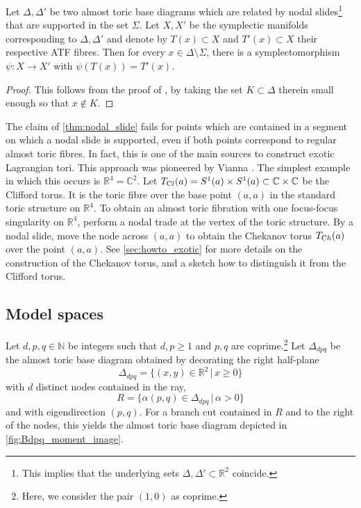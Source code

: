 \documentclass[12pt,a4paper,abstract=true,final]{scrartcl}
\begin{document}
\begin{lemma}
    \label{thm:nodal_slide}
    Let $\Delta, \Delta'$ be two almost toric base diagrams which are related by nodal slides\footnote{This implies that the underlying sets $\Delta, \Delta' \subset \mathbb{R}^2$ coincide.} that are supported in the set $\Sigma$.
Let $X,X'$ be the symplectic manifolds corresponding to $\Delta,\Delta'$ and denote by $T(x) \subset X$ and $T'(x) \subset X$ their respective ATF fibres.
Then for every $x \in \Delta \setminus \Sigma$, there is a symplectomorphism $\psi \colon X \rightarrow X'$ with $\psi(T(x)) = T'(x)$.
\end{lemma}

\begin{proof}
    This follows from the proof of \cite[Theorem 8.10]{evans2021atfs}, by taking the set $K \subset \Delta$ therein small enough so that $x \notin K$.
\end{proof}

\begin{remark}
    \label{rk:slides_ray}
    The claim of \cref{thm:nodal_slide} fails for points which are contained in a segment on which a nodal slide is supported, even if both points correspond to regular almost toric fibres.
In fact, this is one of the main sources to construct exotic Lagrangian tori.
This approach was pioneered by Vianna \cite{Via16,Via17}.
The simplest example in which this occurs is $\mathbb{R}^4 = \mathbb{C}^2$.
Let $T_{\text Cl}(a) = S^1(a) \times S^1(a) \subset \mathbb{C} \times \mathbb{C}$ be the Clifford torus.
It is the toric fibre over the base point $(a,a)$ in the standard toric structure on $\mathbb{R}^4$.
To obtain an almost toric fibration with one focus-focus singularity on $\mathbb{R}^4$, perform a nodal trade at the vertex of the toric structure.
By a nodal slide, move the node across $(a,a)$ to obtain the Chekanov torus $T_{\text Ch}(a)$ over the point $(a,a)$.
See \cref{sec:howto_exotic} for more details on the construction of the Chekanov torus, and a sketch how to distinguish it from the Clifford torus.
\end{remark}


\subsection{Model spaces}
\label{sec:modelspaces}

Let $d,p,q \in \mathbb{N}$ be integers such that $d,p≥1$ and $p,q$ are coprime.\footnote{Here, we consider the pair $(1,0)$ as coprime.}
Let $\Delta_{dpq}$ be the almost toric base diagram obtained by decorating the right half-plane
$$\Delta_{dpq} = \{ (x,y) \in \mathbb{R}^2 \, \vert \, x ≥ 0 \}$$
with $d$ distinct nodes contained in the ray,
\begin{equation}
  \label{eqn:eigenline}
  R = \{\alpha (p,q) \in \Delta_{dpq} \, \vert \, \alpha > 0 \}
\end{equation}
and with eigendirection $(p,q)$.
For a branch cut contained in $R$ and to the right of the nodes, this yields the almost toric base diagram depicted in \cref{fig:Bdpq_moment_image}.
\end{document}
